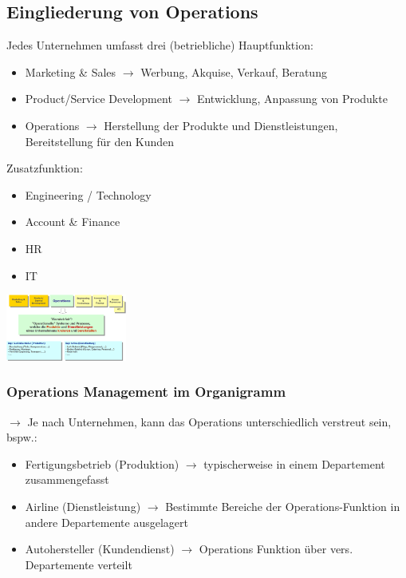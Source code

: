 \documentclass{report}
\newenvironment{Figure}
	{\par\medskip\noindent\minipage{\linewidth}}
	{\endminipage\par\medskip}
\theoremstyle{definition}
\theoremstyle{example}
\begin{document}
   \subsection{Eingliederung von Operations}
Jedes Unternehmen umfasst drei (betriebliche) Hauptfunktion:
\begin{itemize}
   \item Marketing & Sales $\rightarrow$ Werbung, Akquise, Verkauf, Beratung
   \item Product/Service Development $\rightarrow$ Entwicklung, Anpassung von Produkte
   \item Operations $\rightarrow$ Herstellung der Produkte und Dienstleistungen, Bereitstellung für den Kunden
\end{itemize}
Zusatzfunktion:
\begin{itemize}
   \item Engineering / Technology
   \item Account & Finance
   \item HR
   \item IT
\end{itemize}
\begin{Figure}
\centering
\includegraphics[width=150px]{img/Operations.png}
	\label{fig:Operations zentrale betr. Funktion}
\end{Figure}

      \subsubsection{Operations Management im Organigramm}
$\rightarrow$ Je nach Unternehmen, kann das Operations unterschiedlich verstreut sein, bspw.:
\begin{itemize}
   \item Fertigungsbetrieb (Produktion) $\rightarrow$ typischerweise in einem Departement zusammengefasst
   \item Airline (Dienstleistung) $\rightarrow$ Bestimmte Bereiche der Operations-Funktion in andere Departemente ausgelagert
   \item Autohersteller (Kundendienst) $\rightarrow$ Operations Funktion über vers. Departemente verteilt
\end{itemize}
\end{document}
